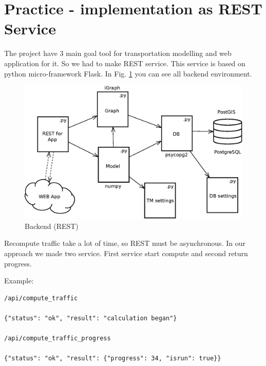 

\section{Practice - implementation as REST Service}
The project have 3 main goal tool for transportation modelling and web application for it. So we had to make REST service. This service is based on python micro-framework Flask. In Fig. \ref{img.b} you can see all backend environment.

\begin{figure}
\centering
\includegraphics[width=15cm]{img/c01-transp-model/backend.eps}
\caption{Backend (REST)}
\label{img.b}
\end{figure}

Recompute traffic take a lot of time, so REST must be asynchronous. In our approach we made two service. First service start compute and second return progress.

Example:
\begin{verbatim}
/api/compute_traffic

{"status": "ok", "result": "calculation began"}

/api/compute_traffic_progress

{"status": "ok", "result": {"progress": 34, "isrun": true}}
\end{verbatim}